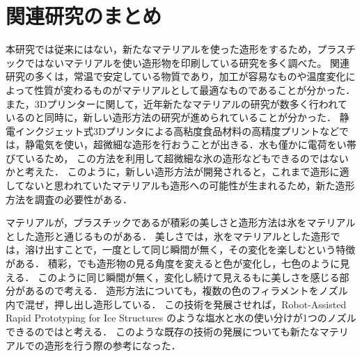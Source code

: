 \section{関連研究のまとめ}
\label{sec:enum}

本研究では従来にはない，新たなマテリアルを使った造形をするため，プラスチックではないマテリアルを使い造形物を印刷している研究を多く調べた。
関連研究の多くは，常温で安定している物質であり，加工が容易なものや温度変化によって性質が変わるものがマテリアルとして最適なものであることが分かった．
また，3Dプリンターに関して，近年新たなマテリアルの研究が数多く行われているのと同時に，新しい造形方法の研究が進められていることが分かった．
静電インクジェット式3Dプリンタによる高粘度食品材料の高精度プリント\cite{e}などでは，静電気を使い，超微細な造形を行おうことが出きる．水も僅かに電荷をい帯びているため，
この方法を利用して超微細な氷の造形などもできるのではないかと考えた．
このように，新しい造形方法が開発されると，これまで造形に適してないと思われていたマテリアルも造形への可能性が生まれるため，新た造形方法を調査の必要性がある．

マテリアルが，プラスチックであるが積彩\cite{h}の美しさと造形方法は氷をマテリアルとした造形と通じるものがある．
美しさでは，氷をマテリアルとした造形では，溶け出すことで，一度として同じ瞬間が無く，その変化を楽しむという特徴がある．
積彩，でも造形物の見る角度を変えると色が変化し，七色のように見える．
このように同じ瞬間が無く，変化し続けて見えるもに美しさを感じる部分があるので考える．
造形方法についても，複数の色のフィラメントをノズル内で混ぜ，押し出し造形している．
この技術を発展させれば，Robot-Assisted Rapid Prototyping for Ice Structures \cite{ss}のような塩水と水の使い分けが1つのノズルできるのではと考える．
このような既存の技術の発展についても新たなマテリアルでの造形を行う際の参考になった．



